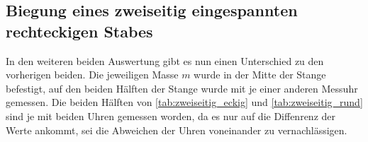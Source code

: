 \subsection{Biegung eines zweiseitig eingespannten rechteckigen Stabes}
\label{sec:Biegung eines zweiseitig eingespannten rechteckigen Stabes}

In den weiteren beiden Auswertung gibt es nun einen Unterschied zu den vorherigen beiden. Die jeweiligen Masse $m$ wurde in der Mitte der Stange befestigt, auf den beiden Hälften der Stange wurde mit je einer anderen Messuhr gemessen. Die beiden Hälften von \autoref{tab:zweiseitig_eckig} und \autoref{tab:zweiseitig_rund} sind je mit beiden Uhren gemessen worden, da es nur auf die Diffenrenz der Werte ankommt, sei die Abweichen der Uhren voneinander zu vernachlässigen. 

\begin{table}
    \centering
    \caption{Messergebnisse zu dem zweiseitig eingespannten rechteckigen Stab}
    \label{tab:zweiseitig_eckig}
\end{table}
